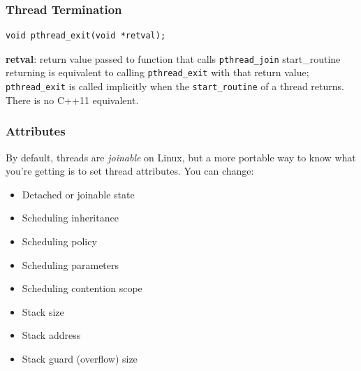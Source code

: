 \begin{frame}[fragile]
  \frametitle{Thread Termination}


  \begin{lstlisting}
void pthread_exit(void *retval);
  \end{lstlisting}
  \vfill
  {\bf retval}: return value passed to function that calls {\tt pthread\_join}
  \vfill
  start\_routine returning is equivalent to calling {\tt pthread\_exit} with
  that return value;
  \vfill
  {\tt pthread\_exit} is called implicitly when the {\tt start\_routine} of a
  thread returns.
  \vfill
  There is no C++11 equivalent.


\end{frame}

\begin{frame}
  \frametitle{Attributes}


  By default, threads are {\it joinable} on Linux, but a more portable way to
  know what you're getting is to set thread attributes. You can change:
  \begin{itemize}
    \item Detached or joinable state
    \item Scheduling inheritance
    \item Scheduling policy
    \item Scheduling parameters
    \item Scheduling contention scope
    \item Stack size
    \item Stack address
    \item Stack guard (overflow) size
  \end{itemize}


\end{frame}

